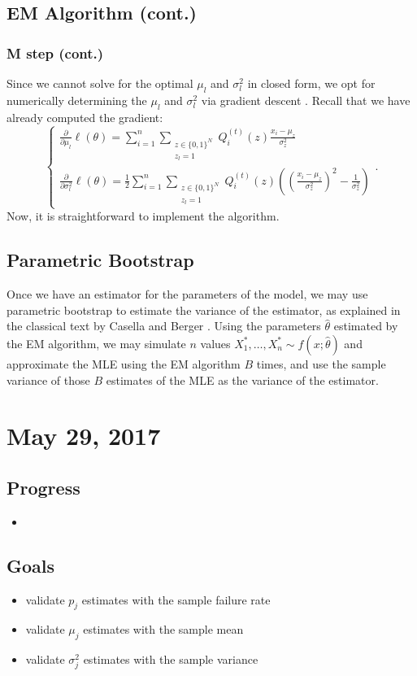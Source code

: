 \documentclass{article}
\begin{document}
\subsection{EM Algorithm (cont.)}
\subsubsection{M step (cont.)}
Since we cannot solve for the optimal $\mu_l$ and $\sigma_l^2$ in closed form, we opt for numerically determining the $\mu_l$ and $\sigma_l^2$ via gradient descent \cite{bishop2006pattern}. Recall that we have already computed the gradient:
\[
  \begin{cases}
    \frac{\partial}{\partial\mu_l}\ell(\theta) = \sum_{i=1}^n\sum_{\substack{z\in\{0,1\}^N \\ z_l = 1}} Q_i^{(t)}(z)\frac{x_i-\mu_z}{\sigma_z^2} \\
    \frac{\partial}{\partial\sigma_l^2}\ell(\theta) = \frac12\sum_{i=1}^n\sum_{\substack{z\in\{0,1\}^N \\ z_l = 1}} Q_i^{(t)}(z)\left(\left(\frac{x_i-\mu_z}{\sigma_z^2}\right)^2-\frac1{\sigma_z^2}\right)
  \end{cases}.
\]
Now, it is straightforward to implement the algorithm.

\subsection{Parametric Bootstrap}
Once we have an estimator for the parameters of the model, we may use parametric bootstrap to estimate the variance of the estimator, as explained in the classical text by Casella and Berger \cite{casella2002statistical}. Using the parameters $\hat\theta$ estimated by the EM algorithm, we may simulate $n$ values $X_1^*, \dots, X_n^*\sim f(x;\hat\theta)$ and approximate the MLE using the EM algorithm $B$ times, and use the sample variance of those $B$ estimates of the MLE as the variance of the estimator.

\section{May 29, 2017}
\subsection{Progress}
\begin{itemize}
  \item
\end{itemize}

\subsection{Goals}
\begin{itemize}
  \item validate $p_j$ estimates with the sample failure rate
  \item validate $\mu_j$ estimates with the sample mean
  \item validate $\sigma_j^2$ estimates with the sample variance
\end{itemize}



\end{document}
